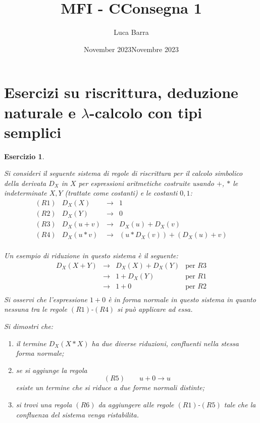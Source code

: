 \documentclass{article}
\title{MFI - C}
\author{Luca Barra}
\date{November 2023}
\title{{\bf Consegna 1}}
\date{Novembre 2023}
\newtheorem{exercise}[definition]{Esercizio}
\begin{document}
\maketitle

\section{Esercizi su riscrittura, deduzione naturale e $\lambda$-calcolo con tipi semplici}


\begin{exercise}\label{ex:riscrittura}{\em
Si consideri il seguente sistema di regole di riscrittura per il calcolo simbolico della derivata $D_X$ in $X$
per espressioni aritmetiche costruite usando $+$, $*$ le indeterminate $X,Y$ (trattate come costanti) e le costanti $0,1$:
\[\begin{array}{lrcl}
(R1)   &   D_X(X) & \to & 1 \\
(R2)   &   D_X(Y) & \to & 0 \\
(R3)   &   D_X(u + v) & \to & D_X(u)  + D_X(v)  \\
(R4)   &   D_X(u * v) & \to & (u * D_X(v)) + (D_X(u) + v) \\
\end{array}\]

\noindent
Un esempio di riduzione in questo sistema \`e il seguente:
\[\begin{array}{llll}
D_X(X + Y) & \to & D_X(X) + D_X(Y) & \mbox{per $R3$} \\
                   & \to & 1 + D_X(Y) & \mbox{per $R1$} \\
                   & \to & 1 + 0 & \mbox{per $R2$} \\
\end{array}\]
Si osservi che l'espressione $1 + 0$ \`e in {\em forma normale} in questo sistema in quanto nessuna tra le regole $(R1)$-$(R4)$
si pu\`o applicare ad essa.

\medskip\noindent
Si dimostri che:
\begin{enumerate}
\item il termine $D_X(X * X)$ ha due diverse riduzioni, confluenti nella stessa forma normale;
\item se si aggiunge la regola 
		\[(R5) \qquad u + 0 \to u\] 
	esiste un termine che si riduce a due forme normali distinte;
\item si trovi una regola $(R6)$ da aggiungere alle regole $(R1)$-$(R5)$ tale che la confluenza del sistema venga ristabilita.
\end{enumerate}
}\end{exercise}
\end{document}
